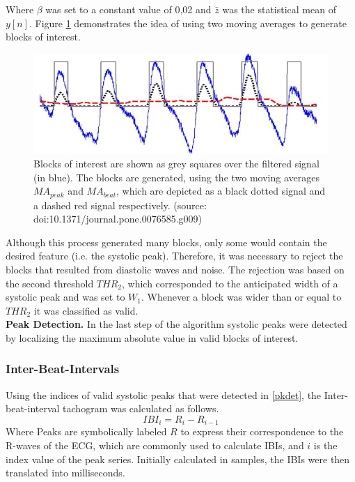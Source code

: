 Where $\beta$ was set to a constant value of 0,02 and $\bar{z}$ was the statistical mean of $y[n]$. Figure \ref{bvp_dta} demonstrates the idea of using two moving averages to generate blocks of interest.\\ 
\begin{figure}[ht]
	\centering
  \includegraphics[width=1.0\textwidth, angle=0]{images/bvp_dta.jpg}
	\caption[Peak Detection Algorithm]{Blocks of interest are shown as grey squares over the filtered signal (in blue). The blocks are generated, using the two moving averages $MA_{peak}$ and $MA_{beat}$, which are depicted as a black dotted signal and a dashed red signal respectively. (source: doi:10.1371/journal.pone.0076585.g009)}
	\label{bvp_dta}
\end{figure}
Although this process generated many blocks, only some would contain the desired feature (i.e. the systolic peak). Therefore, it was necessary to reject the blocks that resulted from diastolic waves and noise. The rejection was based on the second threshold $THR_{2}$, which corresponded to the anticipated width of a systolic peak and was set to $W_{1}$. Whenever a block was wider than or equal to $THR_{2}$ it was classified as valid.\\
\textbf{Peak Detection.}\label{pkdet} In the last step of the algorithm systolic peaks were detected by localizing the maximum absolute value in valid blocks of interest. 

\subsubsection{Inter-Beat-Intervals}
Using the indices of valid systolic peaks that were detected in \ref{pkdet}, the Inter-beat-interval tachogram was calculated as follows.
\begin{equation}
IBI_{i} = R_{i}-R_{i-1}
\end{equation}
Where Peaks are symbolically labeled $R$ to express their correspondence to the R-waves of the ECG, which are commonly used to calculate IBIs, and $i$ is the index value of the peak series.
Initially calculated in samples, the IBIs were then translated into milliseconds.

